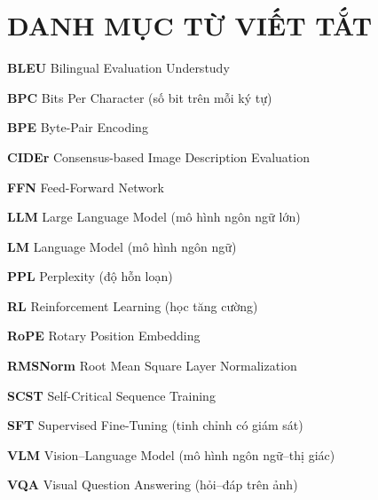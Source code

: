 \chapter*{DANH MỤC TỪ VIẾT TẮT}

\begin{abbrv}
	\item \textbf{BLEU} \quad Bilingual Evaluation Understudy
	\item \textbf{BPC} \quad Bits Per Character (số bit trên mỗi ký tự)
	\item \textbf{BPE} \quad Byte-Pair Encoding
	\item \textbf{CIDEr} \quad Consensus-based Image Description Evaluation
	\item \textbf{FFN} \quad Feed-Forward Network
	\item \textbf{LLM} \quad Large Language Model (mô hình ngôn ngữ lớn)
	\item \textbf{LM} \quad Language Model (mô hình ngôn ngữ)
	\item \textbf{PPL} \quad Perplexity (độ hỗn loạn)
	\item \textbf{RL} \quad Reinforcement Learning (học tăng cường)
	\item \textbf{RoPE} \quad Rotary Position Embedding
	\item \textbf{RMSNorm} \quad Root Mean Square Layer Normalization
	\item \textbf{SCST} \quad Self-Critical Sequence Training
	\item \textbf{SFT} \quad Supervised Fine-Tuning (tinh chỉnh có giám sát)
	\item \textbf{VLM} \quad Vision--Language Model (mô hình ngôn ngữ--thị giác)
	\item \textbf{VQA} \quad Visual Question Answering (hỏi--đáp trên ảnh)
\end{abbrv}
\clearpage
